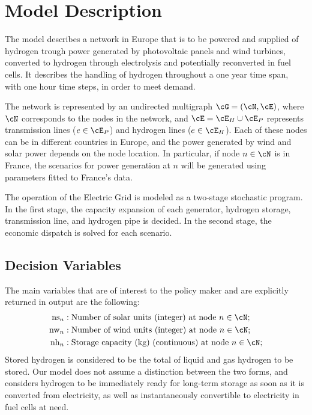 \documentclass[english]{article}
\numberwithin{definition}{section}
\numberwithin{theorem}{section}
\numberwithin{problem}{section}
\begin{document}
\section{Model Description}\label{section: model}

The model describes a network in Europe that is to be powered and supplied of hydrogen trough power generated 
by photovoltaic panels and wind turbines, converted to hydrogen through electrolysis and potentially 
reconverted in fuel cells. It describes the handling of hydrogen throughout a one year time span, with
 one hour time steps, in order to meet demand.

The network is represented by an undirected multigraph \(\cG = (\cN, \cE)\), where \(\cN\) corresponds to the
 nodes in the network, and \(\cE = \cE_H \cup \cE_P\) represents transmission lines (\(e \in \cE_P\)) and
  hydrogen lines (\(e \in \cE_H\)). Each of these nodes can be in different countries in Europe, and the power
   generated by wind and solar power depends on the node location. In particular, if node \(n \in \cN\) is in
    France, the scenarios for power generation at \(n\) will be generated using parameters fitted to France's 
    data.

The operation of the Electric Grid is modeled as a two-stage stochastic program. In the first stage,
the capacity expansion of each generator, hydrogen storage, transmission line, and hydrogen pipe is
decided. In the second stage, the economic dispatch is solved for each scenario.






\newpage



\subsection{Decision Variables}
The main variables that are of interest to the policy maker and are explicitly returned in output are the following:
\begin{align*}
    \text{ns}_n & : \text{Number of solar units (integer) at node } n \in \cN; \\
    \text{nw}_n & : \text{Number of wind units (integer) at node } n \in \cN; \\
    \text{nh}_n & : \text{Storage capacity (kg) (continuous) at node } n \in \cN;
\end{align*}
Stored hydrogen is considered to be the total of liquid and gas hydrogen to be stored. Our model does not assume a distinction between the two forms, and considers hydrogen to be immediately ready for long-term storage as soon as it is converted from electricity, as well as instantaneously convertible to electricity in fuel cells at need.
\end{document}

